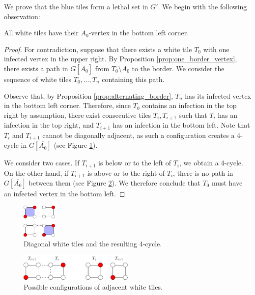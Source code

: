 We prove that the blue tiles form a lethal set in $G'$. We begin with the following observation:

\begin{prop}
\label{prop:bottom_left}
All white tiles have their $A_0$-vertex in the bottom left corner.
\end{prop}

\begin{proof}
For contradiction, suppose that there exists a white tile $T_0$ with one infected vertex in the upper right. By Proposition \ref{prop:one_border_vertex}, there exists a path in $G[\overline{A_0}]$ from $T_0 \setminus A_0$ to the border. We consider the sequence of white tiles $T_0, \dots, T_n$ containing this path. 


Observe that, by Proposition \ref{prop:alternating_border}, $T_n$ has its infected vertex in the bottom left corner. Therefore, since $T_0$ contains an infection in the top right by assumption, there exist consecutive tiles $T_i, T_{i+1}$ such that $T_i$ has an infection in the top right, and $T_{i+1}$ has an infection in the bottom left. Note that $T_i$ and $T_{i+1}$ cannot be diagonally adjacent, as such a configuration creates a 4-cycle in $G[\overline{A_0}]$ (see Figure \ref{fig:tile_cycle}).

We consider two cases. If $T_{i+1}$ is below or to the left of $T_i$, we obtain a 4-cycle. On the other hand, if $T_{i+1}$ is above or to the right of $T_i$, there is no path in $G[\overline{A_0}]$ between them (see Figure \ref{fig:tile_cases}). We therefore conclude that $T_0$ must have an infected vertex in the bottom left.
\end{proof}

\begin{figure}[]
\centering
\includegraphics[width=0.15\textwidth]{figures/6/tile_cycle.pdf}
\caption{Diagonal white tiles and the resulting 4-cycle.}
\label{fig:tile_cycle}
\end{figure} 

\begin{figure}[]
\centering
\includegraphics[width=0.5\textwidth]{figures/6/tile_cases.pdf}
\caption{Possible configurations of adjacent white tiles.}
\label{fig:tile_cases}
\end{figure} 

